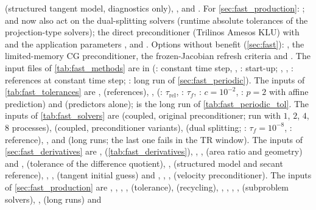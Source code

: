 \documentclass[11pt,a4paper]{article}
\theoremstyle{definition}
\theoremstyle{remark}
\begin{document}
 (structured tangent model, diagnostics only), ,
 and . For
\cref{sec:fast_production}: ;  and
 now also act on the dual-splitting solvers (runtime absolute
tolerances of the projection-type solvers); the direct preconditioner 
(Trilinos Amesos KLU) with  and the application parameters
,  and .
Options without benefit (\cref{sec:fast}):
, the limited-memory CG preconditioner, the frozen-Jacobian refresh
criteria  and . The
input files of \cref{tab:fast_methods} are in 
(: constant time step, , : start-up; ,
, : references at constant time step; : long run of
\cref{sec:fast_periodic}). The inputs of \cref{tab:fast_tolerances} are ,
 (references), ,  (: $\tau_{\mathrm{rel}}$,
: $\tau_f$, : $c=10^{-2}$, : $p=2$ with affine prediction) and
 (predictors alone);  is the long run of \cref{tab:fast_periodic_tol}.
The inputs of \cref{tab:fast_solvers} are  (coupled, original preconditioner; run with
$1$, $2$, $4$, $8$ processes),  (coupled, preconditioner variants),  (dual
splitting; : $\tau_f=10^{-8}$, : reference), , 
and  (long runs; the last one fails in the TR window). The inputs of
\cref{sec:fast_derivatives} are ,  (\cref{tab:fast_derivatives}),
, ,  (area ratio and geometry) and ,
 (tolerance of the difference quotient), ,  (structured
model and secant reference), , ,  (tangent initial guess) and
, , ,  (velocity preconditioner). The inputs of
\cref{sec:fast_production} are , , , , 
(tolerance),  (recycling), , , ,
,  (subproblem solvers), ,  (long runs) and
\end{document}
